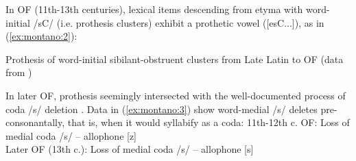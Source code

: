 \documentclass[output=paper,colorlinks,citecolor=brown,
]{langscibook}
\begin{document}
In OF (11th-13th centuries), lexical items descending from etyma with word-initial /sC/ (i.e. prothesis clusters) exhibit a prothetic vowel ([esC...]), as in (\ref{ex:montano:2}): 

\ea\label{ex:montano:2} Prothesis of word-initial sibilant-obstruent clusters from Late Latin to OF (data from 	\citealt{Pope1952, Rohlfs1970, Sampson2010, Montaño2017})\\
    \hspace{0.5cm} 
    \ea {}
    \ex {}
    \ex {}
    \ex {}
\z\z

In later OF, prothesis seemingly intersected with the well-documented process of coda /s/ deletion \citep{Pope1952, Gess1998, Gess1999, baertschdavis2003, Sampson2010}.  Data in (\ref{ex:montano:3}) show word-medial /s/ deletes pre-consonantally, that is, when it would syllabify as a coda:
\ea \label{ex:montano:3}
  \ea\label{ex:montano:3a} 11th-12th c. OF: Loss of medial coda /s/ – allophone [z] \citep{Pope1952} \\
  \hspace{0.5cm} 
    \ea\label{ex:montano:3aa} 
    \ex\label{ex:montano:3ab} 
    \ex\label{ex:montano:3ac} 
    \ex\label{ex:montano:3ad} 
	\z
  \ex\label{ex:montano:3b} Later OF (13th c.): Loss of medial coda /s/ – allophone [s] \citep{Pope1952} \\
  \hspace{0.5cm} 
    \ea\label{ex:montano:3be} 
	\ex\label{ex:montano:3bf} 
	\ex\label{ex:montano:3bg} 
	\ex\label{ex:montano:3bh} 
	\ex\label{ex:montano:3bi} 
	\ex\label{ex:montano:3bj} 	      
	\z
\z\z
 
\end{document}
